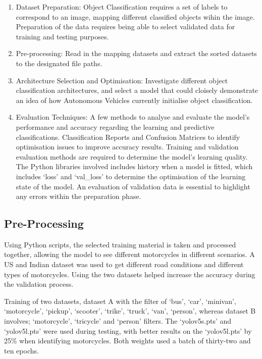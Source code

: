 \documentclass[conference]{IEEEtran}
\begin{document}
	\begin{enumerate}
		\item Dataset Preparation: Object Classification requires a set of labels to correspond to an image, mapping different classified objects wihin the image. Preparation of the data requires being able to select validated data for training and testing purposes.
		\item Pre-processing: Read in the mapping datasets and extract the sorted datasets to the designated file paths. 
		\item Architecture Selection and Optimisation: Investigate different object classification architectures, and select a model that could cloisely demonstrate an idea of how Autonomous Vehicles currently initialise object classification.
		\item Evaluation Techniques: A few methods to analyse and evaluate the model's performance and accuracy regarding the learning and predictive classifications. Classification Reports and Confusion Matrices to identify optimisation issues to improve accuracy results. Training and validation evaluation methods are required to determine the model's learning quality. The Python libraries involved includes history when a model is fitted, which includes `loss' and `val\_loss' to determine the optimisation of the learning state of the model. An evaluation of validation data is essential to highlight any errors within the preparation phase.
	\end{enumerate}

	\subsection{Pre-Processing}
	\label{subsec:preprocessing}
		Using Python scripts, the selected training material is taken and processed together, allowing the model to see different motorcycles in different scenarios. A US and Indian dataset was used to get different road conditions and different types of motorcycles. Using the two datasets helped increase the accuracy during the validation process.

		Training of two datasets, dataset A with the filter of `bus', `car', `minivan', `motorcycle', `pickup', `scooter', `trike', `truck', `van', `person', whereas dataset B involves; `motorcycle', `tricycle' and `person' filters. The `yolov5s.pts' and `yolov5l.pts' were used during testing, with better results on the `yolov5l.pts' by 25\% when identifying motorcycles. Both weights used a batch of thirty-two and ten epochs.
\end{document}
